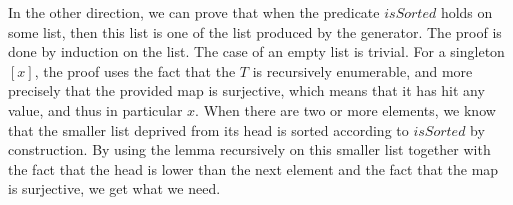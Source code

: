 In the other direction, we can prove that when the predicate $isSorted$ holds on some list, then this list is one of the list produced by the generator. The proof is done by induction on the list. The case of an empty list is trivial. For a singleton $[x]$, the proof uses the fact that the $T$ is recursively enumerable, and more precisely that the provided map is surjective, which means that it has hit any value, and thus in particular $x$. When there are two or more elements, we know that the smaller list deprived from its head is sorted according to $isSorted$ by construction. By using the lemma recursively on this smaller list together with the fact that the head is lower than the next element and the fact that the map is surjective, we get what we need.